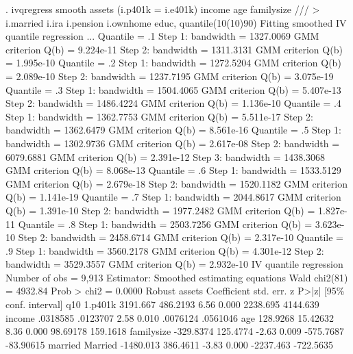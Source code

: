 . ivqregress smooth assets (i.p401k = i.e401k) income age familysize      ///
>         i.married i.ira i.pension i.ownhome educ, quantile(10(10)90)
{\smallskip}
Fitting smoothed IV quantile regression ...
{\smallskip}
Quantile = .1
Step 1:   bandwidth =  1327.0069    GMM criterion Q(b) =  9.224e-11
Step 2:   bandwidth =  1311.3131    GMM criterion Q(b) =  1.995e-10
{\smallskip}
Quantile = .2
Step 1:   bandwidth =  1272.5204    GMM criterion Q(b) =  2.089e-10
Step 2:   bandwidth =  1237.7195    GMM criterion Q(b) =  3.075e-19
{\smallskip}
Quantile = .3
Step 1:   bandwidth =  1504.4065    GMM criterion Q(b) =  5.407e-13
Step 2:   bandwidth =  1486.4224    GMM criterion Q(b) =  1.136e-10
{\smallskip}
Quantile = .4
Step 1:   bandwidth =  1362.7753    GMM criterion Q(b) =  5.511e-17
Step 2:   bandwidth =  1362.6479    GMM criterion Q(b) =  8.561e-16
{\smallskip}
Quantile = .5
Step 1:   bandwidth =  1302.9736    GMM criterion Q(b) =  2.617e-08
Step 2:   bandwidth =  6079.6881    GMM criterion Q(b) =  2.391e-12
Step 3:   bandwidth =  1438.3068    GMM criterion Q(b) =  8.068e-13
{\smallskip}
Quantile = .6
Step 1:   bandwidth =  1533.5129    GMM criterion Q(b) =  2.679e-18
Step 2:   bandwidth =  1520.1182    GMM criterion Q(b) =  1.141e-19
{\smallskip}
Quantile = .7
Step 1:   bandwidth =  2044.8617    GMM criterion Q(b) =  1.391e-10
Step 2:   bandwidth =  1977.2482    GMM criterion Q(b) =  1.827e-11
{\smallskip}
Quantile = .8
Step 1:   bandwidth =  2503.7256    GMM criterion Q(b) =  3.623e-10
Step 2:   bandwidth =  2458.6714    GMM criterion Q(b) =  2.317e-10
{\smallskip}
Quantile = .9
Step 1:   bandwidth =  3560.2178    GMM criterion Q(b) =  4.301e-12
Step 2:   bandwidth =  3529.3557    GMM criterion Q(b) =  2.932e-10
{\smallskip}
IV quantile regression                                 Number of obs =   9,913
Estimator: Smoothed estimating equations               Wald chi2(81) = 4932.84
                                                       Prob > chi2   =  0.0000
{\smallskip}
             {\VBAR}               Robust
      assets {\VBAR} Coefficient  std. err.      z    P>|z|     [95\% conf. interval]
q10          {\VBAR}
     1.p401k {\VBAR}   3191.667   486.2193     6.56   0.000     2238.695    4144.639
      income {\VBAR}   .0318585   .0123707     2.58   0.010     .0076124    .0561046
         age {\VBAR}   128.9268   15.42632     8.36   0.000     98.69178    159.1618
  familysize {\VBAR}  -329.8374   125.4774    -2.63   0.009    -575.7687   -83.90615
             {\VBAR}
     married {\VBAR}
    Married  {\VBAR}  -1480.013   386.4611    -3.83   0.000    -2237.463   -722.5635

